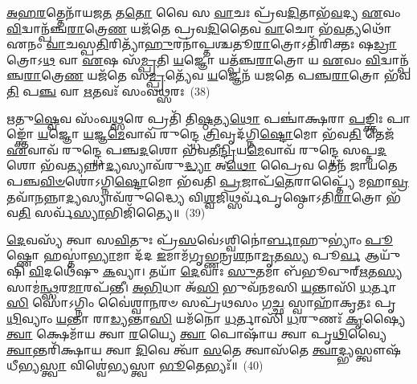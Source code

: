 \-\ul{𑌅}\-\-\ul{𑌹}\-\-\ul{𑌰}\-𑌤𑍍𑌤𑍇𑌨𑌾᳴𑌯𑌜\-\ul{𑌤} 𑌤\-\ul{𑌤𑍋} 𑌵𑍈 𑌸 \ul{𑌵𑌾}\-𑌚𑌃 𑌪𑍍𑌰᳴𑌵\-\ul{𑌦𑌿}\-𑌤𑌾𑌭᳴\-\ul{𑌵}\-𑌦𑍍𑌯 \ul{𑌏}\-𑌵𑌂 \ul{𑌵𑌿}\-𑌦𑍍𑌵𑌾𑌨𑍍𑌪᳴𑌞𑍍𑌚\-\ul{𑌰𑌾}\-𑌤𑍍𑌰𑍇\-\ul{𑌣} 𑌯𑌜᳴𑌤𑍇 𑌪𑍍𑌰𑌵\-\ul{𑌦𑌿}\-𑌤𑍈𑌵 \ul{𑌵𑌾}\-𑌚𑍋 𑌭᳴\-\ul{𑌵}\-𑌤𑍍𑌯𑌥𑍋᳴ 𑌏𑌨𑌂 \ul{𑌵𑌾}\-𑌚𑌸𑍍𑌪\-\ul{𑌤𑌿}\-𑌰𑌿𑌤𑍍𑌯𑌾᳴\-\ul{𑌹𑍁}\-𑌰𑌨𑌾॑𑌪𑍍𑌤𑌶𑍍𑌚𑌤𑍂\-\ul{𑌰𑌾}\-𑌤𑍍𑌰𑍋\-𑌽𑌤𑌿᳴𑌰𑌿𑌕𑍍𑌤𑌃 𑌷\-\ul{𑌡𑍍𑌰𑌾}\-𑌤𑍍𑌰𑍋\-𑌽\-\ul{𑌥} 𑌵𑌾 \ul{𑌏}\-𑌷 𑌸᳴\-\ul{𑌮𑍍𑌪𑍍𑌰}\-𑌤𑌿 \ul{𑌯}\-𑌜𑍍𑌞𑍋 𑌯𑌤𑍍𑌪᳴𑌞𑍍𑌚\-\ul{𑌰𑌾}\-𑌤𑍍𑌰𑍋 𑌯 \ul{𑌏}\-𑌵𑌂 \ul{𑌵𑌿}\-𑌦𑍍𑌵𑌾𑌨𑍍𑌪᳴𑌞𑍍𑌚\-\ul{𑌰𑌾}\-𑌤𑍍𑌰𑍇\-\ul{𑌣} 𑌯𑌜᳴𑌤𑍇 𑌸\-\ul{𑌮𑍍𑌪𑍍𑌰}\-𑌤𑍍𑌯𑍇᳴𑌵 \ul{𑌯}\-𑌜𑍍𑌞𑍇𑌨᳴ 𑌯𑌜𑌤𑍇 𑌪𑌞𑍍𑌚\-\ul{𑌰𑌾}\-𑌤𑍍𑌰𑍋 𑌭᳴𑌵\-\ul{𑌤𑌿} 𑌪\-\ul{𑌞𑍍𑌚} 𑌵𑌾 \ul{𑌋}\-𑌤𑌵𑌃᳴ 𑌸𑌂𑌵\-\ul{𑌥𑍍𑌸}\-𑌰𑌃~(38)

\-\ul{𑌋}\-𑌤𑍁\-\ul{𑌷𑍍𑌵𑍇}\-𑌵 𑌸𑌂᳴𑌵\-\ul{𑌥𑍍𑌸}\-𑌰𑍇 𑌪𑍍𑌰𑌤𑌿᳴ 𑌤𑌿\-\ul{𑌷𑍍𑌠}\-𑌤𑍍𑌯\-\ul{𑌥𑍋} 𑌪𑌞𑍍𑌚𑌾॑𑌕𑍍𑌷𑌰𑌾 \ul{𑌪}\-𑌙𑍍𑌕𑍍𑌤𑌿𑌃 𑌪𑌾𑌙𑍍𑌕𑍍𑌤𑍋᳴ \ul{𑌯}\-𑌜𑍍𑌞𑍋 \ul{𑌯}\-𑌜𑍍𑌞\-\ul{𑌮𑍇}\-𑌵𑌾𑌵᳴ 𑌰𑍁𑌨𑍍𑌦𑍍𑌧𑍇 \ul{𑌤𑍍𑌰𑌿}\-𑌵𑍃𑌦᳴𑌗𑍍𑌨𑌿\-\ul{𑌷𑍍𑌟𑍋}\-𑌮𑍋 𑌭᳴𑌵\-\ul{𑌤𑌿} 𑌤𑍇𑌜᳴ \ul{𑌏}\-𑌵𑌾𑌵᳴ 𑌰𑍁𑌨𑍍𑌦𑍍𑌧𑍇 𑌪𑌞𑍍𑌚\-\ul{𑌦}\-𑌶𑍋 𑌭᳴𑌵𑌤𑍀\-\ul{𑌨𑍍𑌦𑍍𑌰𑌿}\-𑌯\-\ul{𑌮𑍇}\-𑌵𑌾𑌵᳴ 𑌰𑍁𑌨𑍍𑌦𑍍𑌧𑍇 𑌸𑌪𑍍𑌤\-\ul{𑌦}\-𑌶𑍋 𑌭᳴𑌵\-\ul{𑌤𑍍𑌯}\-𑌨𑍍𑌨𑌾\-\ul{𑌦𑍍𑌯}\-𑌸𑍍𑌯𑌾𑌵᳴𑌰𑍁\-\ul{𑌦𑍍𑌧𑍍𑌯𑌾} 𑌅\-\ul{𑌥𑍋} 𑌪𑍍𑌰𑍈𑌵 𑌤𑍇𑌨᳴ 𑌜𑌾𑌯𑌤𑍇 𑌪𑌞𑍍𑌚\-\ul{𑌵𑌿}\-\-\ul{𑍞}\-𑌶𑍋॑\-𑌽𑌗𑍍𑌨𑌿\-\ul{𑌷𑍍𑌟𑍋}\-𑌮𑍋 𑌭᳴𑌵𑌤𑌿 \ul{𑌪𑍍𑌰}\-𑌜𑌾𑌪᳴\-\ul{𑌤𑍇}\-𑌰𑌾𑌪𑍍𑌤𑍍𑌯𑍈᳴ 𑌮𑌹𑌾\-\ul{𑌵𑍍𑌰}\-𑌤𑌵𑌾᳴\-\ul{𑌨}\-𑌨𑍍𑌨𑌾\-\ul{𑌦𑍍𑌯}\-𑌸𑍍𑌯𑌾𑌵᳴𑌰𑍁𑌦𑍍𑌧𑍍𑌯𑍈 𑌵𑌿\-\ul{𑌶𑍍𑌵}\-𑌜𑌿𑌥𑍍𑌸𑌰𑍍𑌵᳴𑌪𑍃𑌷𑍍𑌠𑍋\-𑌽𑌤𑌿\-\ul{𑌰𑌾}\-𑌤𑍍𑌰𑍋 𑌭᳴𑌵\-\ul{𑌤𑌿} 𑌸𑌰𑍍𑌵᳴\-\ul{𑌸𑍍𑌯𑌾}\-𑌭𑌿𑌜𑌿᳴𑌤𑍍𑌯𑍈॥~(39)

{\anuvakamend[{𑌤𑍇 𑌵𑍍𑌯𑌾𑌵᳴𑌰𑍍𑌤𑌨𑍍𑌤 𑌪𑍍𑌰𑌵\-\ul{𑌦𑌿}\-𑌤𑌾 \ul{𑌸𑍍𑌯𑌾}\-𑌮𑌿\-\ul{𑌤𑌿} 𑌸 \ul{𑌏}\-𑌤𑌮𑍍𑌪़᳴𑌞𑍍𑌚\-\ul{𑌰𑌾}\-𑌤𑍍𑌰𑌮𑌾 𑌸𑌂᳴𑌵\-\ul{𑌥𑍍𑌸}\-𑌰𑍋᳴\-𑌽𑌭𑌿𑌜𑌿᳴𑌤𑍍𑌯𑍈}]}%

\-\ul{𑌦𑍇}\-𑌵𑌸𑍍𑌯᳴ 𑌤𑍍𑌵𑌾 𑌸\-\ul{𑌵𑌿}\-𑌤𑍁𑌃 𑌪𑍍𑌰᳴\-\ul{𑌸}\-𑌵𑍇॑\-𑌽𑌶𑍍𑌵𑌿𑌨𑍋॑\-\ul{𑌰𑍍𑌬𑌾}\-𑌹𑍁\-𑌭𑍍𑌯𑌾𑌂॑ \ul{𑌪𑍂}\-𑌷𑍍𑌣𑍋 𑌹𑌸𑍍𑌤𑌾॑\-\ul{𑌭𑍍𑌯𑌾}\-𑌮𑌾 𑌦᳴𑌦 \ul{𑌇}\-𑌮𑌾𑌮᳴𑌗𑍃𑌭𑍍𑌣𑌨𑍍𑌰\-\ul{𑌶}\-𑌨𑌾\-\ul{𑌮𑍃}\-𑌤\-\ul{𑌸𑍍𑌯} 𑌪𑍂\-\ul{𑌰𑍍𑌵} 𑌆𑌯𑍁᳴𑌷𑌿 \ul{𑌵𑌿}\-𑌦𑌥𑍇᳴𑌷𑍁 \ul{𑌕}\-𑌵𑍍𑌯𑌾। 𑌤𑌯𑌾᳴ \ul{𑌦𑍇}\-𑌵𑌾𑌃 \ul{𑌸𑍁}\-𑌤𑌮𑌾 𑌬᳴𑌭𑍂𑌵𑍁𑌰𑍍\mbox{}\-\ul{𑌋}\-𑌤\-\ul{𑌸𑍍𑌯} 𑌸𑌾𑌮॑\-\ul{𑌨𑍍𑌥𑍍𑌸}\-𑌰\-\ul{𑌮𑌾}\-𑌰𑌪᳴𑌨𑍍𑌤𑍀। \ul{𑌅}\-\-\ul{𑌭𑌿}\-𑌧𑌾 𑌅᳴\-\ul{𑌸𑌿} 𑌭𑍁𑌵᳴𑌨𑌮𑌸𑌿 \ul{𑌯}\-𑌨𑍍𑌤𑌾𑌸𑌿᳴ \ul{𑌧}\-𑌰𑍍𑌤𑌾\-\ul{𑌸𑌿} 𑌸𑍋॑\-𑌽𑌗𑍍𑌨𑌿𑌂 𑌵𑍈॑𑌶𑍍𑌵𑌾\-\ul{𑌨}\-𑌰𑍞 𑌸𑌪𑍍𑌰᳴𑌥𑌸𑌂 𑌗\-\ul{𑌚𑍍𑌛} 𑌸𑍍𑌵𑌾𑌹𑌾᳴𑌕𑍃𑌤𑌃 𑌪𑍃\-\ul{𑌥𑌿}\-𑌵𑍍𑌯𑌾𑌂 \ul{𑌯}\-𑌨𑍍𑌤𑌾 𑌰𑌾\-\ul{𑌡𑍍𑌯}\-𑌨𑍍𑌤𑌾\-\ul{𑌸𑌿} 𑌯𑌮᳴𑌨𑍋 \ul{𑌧}\-𑌰𑍍𑌤𑌾𑌸𑌿᳴ \ul{𑌧}\-𑌰𑍁𑌣𑌃᳴ \ul{𑌕𑍃}\-𑌷𑍍𑌯𑍈 \ul{𑌤𑍍𑌵𑌾} 𑌕𑍍𑌷𑍇𑌮𑌾᳴𑌯 𑌤𑍍𑌵𑌾 \ul{𑌰}\-𑌯𑍍𑌯𑍈 \ul{𑌤𑍍𑌵𑌾} 𑌪𑍋𑌷𑌾᳴𑌯 𑌤𑍍𑌵𑌾 𑌪𑍃\-\ul{𑌥𑌿}\-𑌵𑍍𑌯𑍈 \ul{𑌤𑍍𑌵𑌾}\-𑌨𑍍𑌤𑌰𑌿᳴𑌕𑍍𑌷𑌾𑌯 𑌤𑍍𑌵𑌾 \ul{𑌦𑌿}\-𑌵𑍇 𑌤𑍍𑌵𑌾᳴ \ul{𑌸}\-𑌤𑍇 𑌤𑍍𑌵𑌾𑌸᳴𑌤𑍇 \ul{𑌤𑍍𑌵𑌾}\-𑌦𑍍𑌭𑍍𑌯𑌸𑍍𑌤𑍍𑌵𑍗𑌷᳴𑌧𑍀𑌭𑍍𑌯\-\ul{𑌸𑍍𑌤𑍍𑌵𑌾} 𑌵𑌿𑌶𑍍𑌵𑍇॑𑌭𑍍𑌯𑌸𑍍𑌤𑍍𑌵𑌾 \ul{𑌭𑍂}\-𑌤𑍇𑌭𑍍𑌯𑌃᳴॥~(40)

{\anuvakamend[{\-\ul{𑌧}\-𑌰𑍁\-\ul{𑌣𑌃} 𑌪़𑌞𑍍𑌚᳴𑌵𑌿𑍞𑌶𑌤𑌿𑌶𑍍𑌚}]}%

